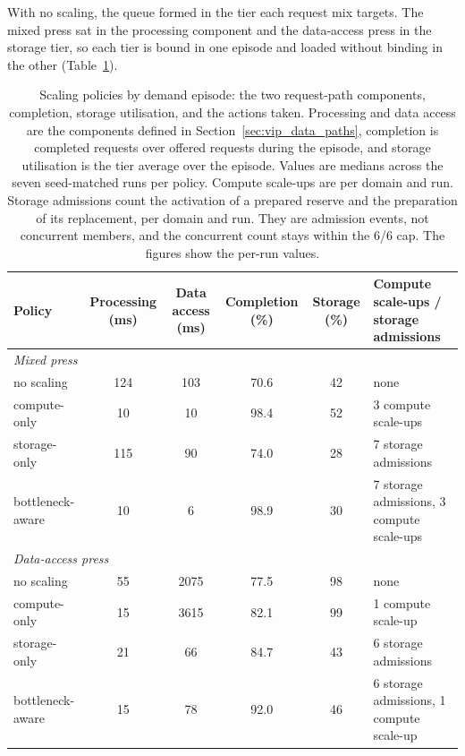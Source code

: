 ﻿\documentclass[12pt,reqno,twoside]{amsbook}
\begin{document}
With no scaling, the queue formed in the tier each request mix targets. The
mixed press sat in the processing component and the data-access press in the
storage tier, so each tier is bound in one episode and loaded without binding
in the other (Table~\ref{tab:rq2_arms}).

\begin{table}[htbp]
    \centering
    \caption{Scaling policies by demand episode: the two request-path
    components, completion, storage utilisation, and the actions taken.
    Processing and data access are the components defined in
    Section~\ref{sec:vip_data_paths}, completion is completed requests over
    offered requests during the episode, and storage utilisation is the tier
    average over the episode. Values are medians across the seven seed-matched
    runs per policy. Compute scale-ups are per domain and run. Storage
    admissions count the activation of a prepared reserve and the preparation
    of its replacement, per domain and run. They are admission events, not
    concurrent members, and the concurrent count stays within the 6/6 cap. The
    figures show the per-run values.}
    \label{tab:rq2_arms}
    \footnotesize
    \setlength{\tabcolsep}{3pt}
    \begin{tabular}{p{} c c c c p{}}
        \toprule
        Policy & Processing (ms) & Data access (ms) & Completion (\%) & Storage (\%) & Compute scale-ups / storage admissions \\
        \midrule
        \multicolumn{6}{l}{\emph{Mixed press}} \\
        no scaling & 124 & 103 & 70.6 & 42 & none \\
        compute-only & 10 & 10 & 98.4 & 52 & 3 compute scale-ups \\
        storage-only & 115 & 90 & 74.0 & 28 & 7 storage admissions \\
        bottleneck-aware & 10 & 6 & 98.9 & 30 & 7 storage admissions, 3 compute scale-ups \\
        \midrule
        \multicolumn{6}{l}{\emph{Data-access press}} \\
        no scaling & 55 & 2075 & 77.5 & 98 & none \\
        compute-only & 15 & 3615 & 82.1 & 99 & 1 compute scale-up \\
        storage-only & 21 & 66 & 84.7 & 43 & 6 storage admissions \\
        bottleneck-aware & 15 & 78 & 92.0 & 46 & 6 storage admissions, 1 compute scale-up \\
        \bottomrule
    \end{tabular}
\end{table}
\end{document}
